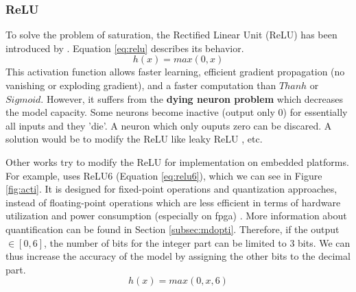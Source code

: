 \subsubsection{ReLU}
To solve the problem of saturation, the Rectified Linear Unit (ReLU) has been introduced by \textcite{krizhevsky_imagenet_2012}. Equation \eqref{eq:relu} describes its behavior.
\begin{equation}
    h(x) = max(0, x)
    \label{eq:relu}
\end{equation}
%
This activation function allows faster learning, efficient gradient propagation (no vanishing or exploding gradient), and a faster computation than $Thanh$ or $Sigmoid$. However, it suffers from the \textbf{dying neuron problem} which decreases the model capacity. Some neurons become inactive (output only 0) for essentially all inputs and they 'die'. A neuron which only ouputs zero can be discared. A solution would be to modify the ReLU like leaky ReLU \cite{maas_rectier_2014}, etc.

Other works try to modify the ReLU for implementation on embedded platforms. For example, \cite{howard_mobilenets_2017} uses ReLU6 (Equation \eqref{eq:relu6}), which we can see in Figure \ref{fig:acti}. It is designed for fixed-point operations and quantization approaches, instead of floating-point operations which are less efficient in terms of hardware utilization and power consumption (especially on \acrshort{fpga}) \cite{david_hardware_2007}. More information about quantification can be found in Section \ref{subsec:mdopti}. Therefore, if the output $\in [ 0, 6 ]$, the number of bits for the integer part can be limited to 3 bits. We can thus increase the accuracy of the model by assigning the other bits to the decimal part.
%
\begin{equation}
    h(x) = max(0, x, 6)
    \label{eq:relu6}
\end{equation}
